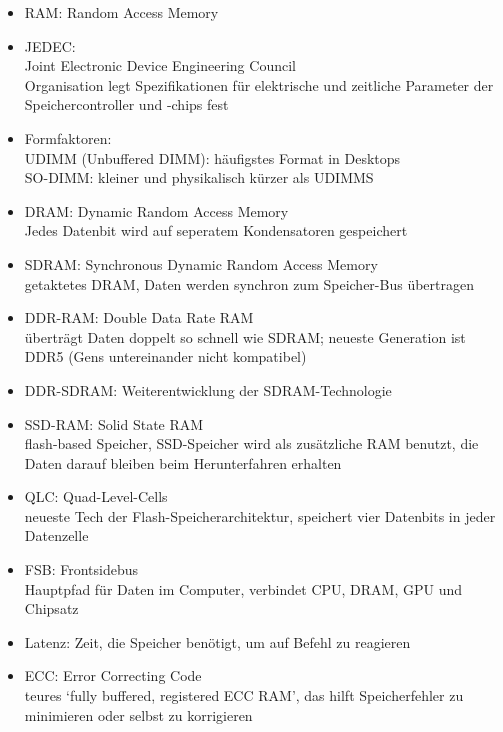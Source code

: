     \begin{tcolorbox}[width=15cm, center, title=RAM Begriffe, coltitle=white, colframe=orange, colback=white!60!orange]
        \begin{itemize}[itemsep=0.1em, parsep=0.3em]
            \item RAM\@: Random Access Memory
            \item JEDEC\@: \\ Joint Electronic Device Engineering Council \\ Organisation legt Spezifikationen für elektrische und zeitliche Parameter der Speichercontroller und -chips fest
            \item Formfaktoren: \\ UDIMM (Unbuffered DIMM): häufigstes Format in Desktops \\ SO-DIMM\@: kleiner und physikalisch kürzer als UDIMMS
            \item DRAM\@: Dynamic Random Access Memory \\ Jedes Datenbit wird auf seperatem Kondensatoren gespeichert
            \item SDRAM\@: Synchronous Dynamic Random Access Memory \\ getaktetes DRAM, Daten werden synchron zum Speicher-Bus übertragen
            \item DDR-RAM\@: Double Data Rate RAM \\ überträgt Daten doppelt so schnell wie SDRAM\@; neueste Generation ist DDR5 (Gens untereinander nicht kompatibel)
            \item DDR-SDRAM\@: Weiterentwicklung der SDRAM-Technologie
            \item SSD-RAM\@: Solid State RAM \\ flash-based Speicher, SSD-Speicher wird als zusätzliche RAM benutzt, die Daten darauf bleiben beim Herunterfahren erhalten
            \item QLC\@: Quad-Level-Cells \\ neueste Tech der Flash-Speicherarchitektur, speichert vier Datenbits in jeder Datenzelle
            \item FSB\@: Frontsidebus \\ Hauptpfad für Daten im Computer, verbindet CPU, DRAM, GPU und Chipsatz
            \item Latenz\@: Zeit, die Speicher benötigt, um auf Befehl zu reagieren
            \item ECC\@: Error Correcting Code \\ teures `fully buffered, registered ECC RAM', das hilft Speicherfehler zu minimieren oder selbst zu korrigieren 
        \end{itemize}
    \end{tcolorbox}


